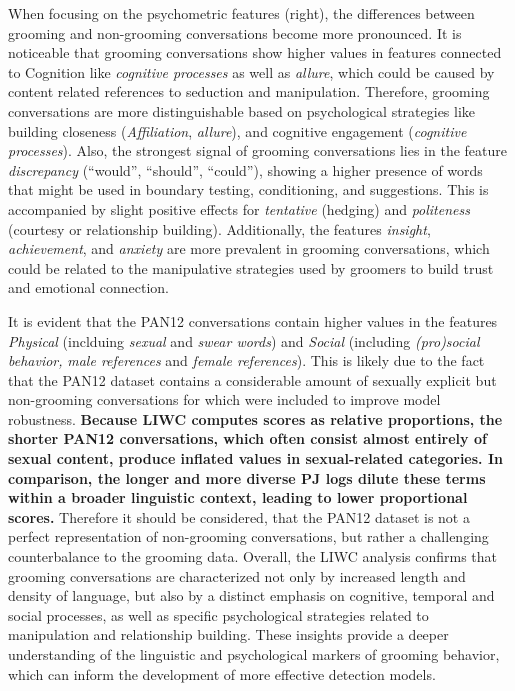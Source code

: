 When focusing on the psychometric features (right), the differences between grooming and non-grooming conversations become more pronounced. It is noticeable that grooming conversations show higher values in features connected to {Cognition} like \textit{cognitive processes} as well as \textit{allure}, which could be caused by content related references to seduction and manipulation. Therefore, grooming conversations are more distinguishable based on psychological strategies like building closeness (\textit{Affiliation}, \textit{allure}), and cognitive engagement (\textit{cognitive processes}). Also, the strongest signal of grooming conversations lies in the feature \textit{discrepancy} (“would”, “should”, “could”), showing a higher presence of words that might be used in boundary testing, conditioning, and suggestions. This is accompanied by slight positive effects for \textit{tentative} (hedging) and \textit{politeness} (courtesy or relationship building). Additionally, the features \textit{insight}, \textit{achievement}, and \textit{anxiety} are more prevalent in grooming conversations, which could be related to the manipulative strategies used by groomers to build trust and emotional connection. 

It is evident that the PAN12 conversations contain higher values in the features \textit{Physical} (inclduing \textit{sexual} and \textit{swear words}) and \textit{Social} (including \textit{(pro)social behavior,}  \textit{male references} and \textit{female references}). This is likely due to the fact that the PAN12 dataset contains a considerable amount of sexually explicit but non-grooming conversations for which were included to improve model robustness. \textbf{Because LIWC computes scores as relative proportions, the shorter PAN12 conversations, which often consist almost entirely of sexual content, produce inflated values in sexual-related categories. In comparison, the longer and more diverse PJ logs dilute these terms within a broader linguistic context, leading to lower proportional scores.} Therefore it should be considered, that the PAN12 dataset is not a perfect representation of non-grooming conversations, but rather a challenging counterbalance to the grooming data. Overall, the LIWC analysis confirms that grooming conversations are characterized not only by increased length and density of language, but also by a distinct emphasis on cognitive, temporal and social processes, as well as specific psychological strategies related to manipulation and relationship building. These insights provide a deeper understanding of the linguistic and psychological markers of grooming behavior, which can inform the development of more effective detection models.


